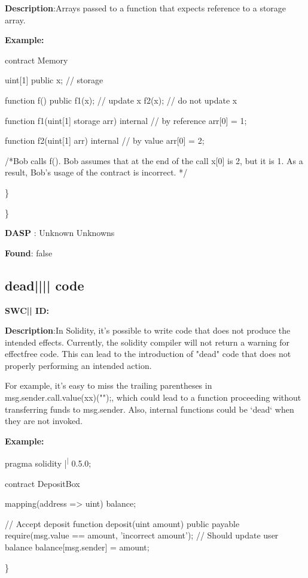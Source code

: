 \documentclass{article}
\begin{document}
\textbf{Description}:Arrays passed to a function that expects reference to a storage array.


\textbf{Example:} 
\begin{ffcode} 

contract Memory {
    uint[1] public x; // storage

    function f() public {
        f1(x); // update x
        f2(x); // do not update x
    }

    function f1(uint[1] storage arr) internal { // by reference
        arr[0] = 1;
    }

    function f2(uint[1] arr) internal { // by value
        arr[0] = 2;
    }
}

 /*Bob calls f(). Bob assumes that at the end of the call x[0] is 2, but it is 1. As a result, Bob's usage of the contract is incorrect. */ 

\end{ffcode} 
\} 

\} 

\textbf{DASP} : Unknown Unknowns

\textbf{Found}: false

\subsection{dead{||\textunderscore|| }code} 
\textbf{SWC{|\textunderscore| }ID:} 

\textbf{Description}:In Solidity, it's possible to write code that does not produce the intended effects. Currently, the solidity compiler will not return a warning for effect{\textendash}free code. This can lead to the introduction of "dead" code that does not properly performing an intended action.

For example, it's easy to miss the trailing parentheses in msg.sender.call.value(xx)("");, which could lead to a function proceeding without transferring funds to msg.sender. Also, internal functions could be `dead` when they are not invoked.


\textbf{Example:} 
\begin{ffcode} 

pragma solidity |\textsuperscript| 0.5.0;

contract DepositBox {
    mapping(address => uint) balance;

    // Accept deposit
    function deposit(uint amount) public payable {
        require(msg.value == amount, 'incorrect amount');
        // Should update user balance
        balance[msg.sender] = amount;
    }
}

\end{ffcode} 
\} 
\end{document}
